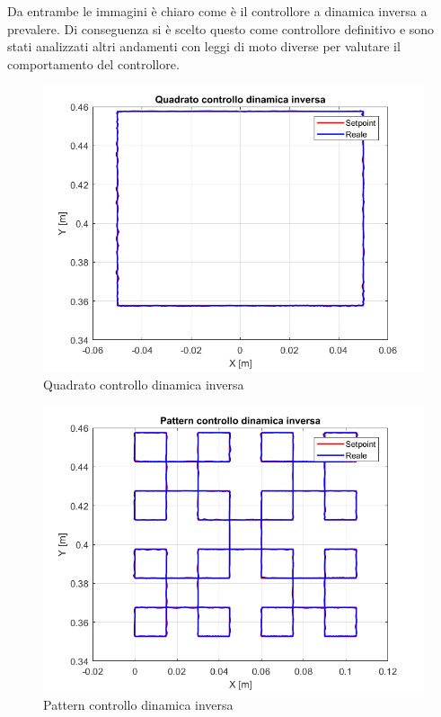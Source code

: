 Da entrambe le immagini è chiaro come è il controllore a dinamica inversa a prevalere. Di conseguenza si è scelto questo come controllore definitivo e sono stati analizzati altri andamenti con leggi di moto diverse per valutare il comportamento del controllore.
\begin{figure}[ht]
	\begin{center}
		\includegraphics[scale=0.45]{Immagini/Traiettorie/QuadratoDinamicaInversa}
		\caption{Quadrato controllo dinamica inversa}
		\label{fig:quadID}
	\end{center}
\end{figure}
\begin{figure}[ht]
	\begin{center}
		\includegraphics[scale=0.45]{Immagini/Traiettorie/PatternDinamicaInversa}
		\caption{Pattern controllo dinamica inversa}
		\label{fig:patternID}
	\end{center}
\end{figure}
